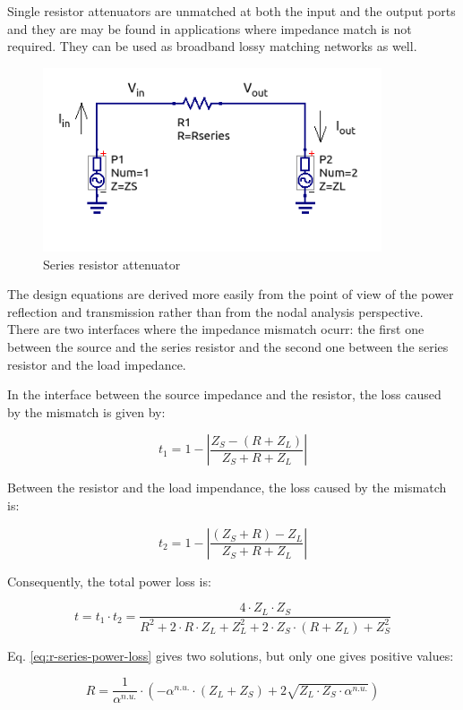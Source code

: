 \noindent Single resistor attenuators are unmatched at both the input and the output ports and they are may be found in applications where impedance match is not required. They can be used as broadband lossy matching networks as well.

  \begin{figure}[ht]
    \centering
    \includegraphics[width=10cm]{./images/r-series-attenuator-schematic.png}
    \caption{Series resistor attenuator}
    \label{fig:r-series-attenuator-schematic}
  \end{figure}

\noindent The design equations are derived more easily from the point of view of the power reflection and transmission rather than from the nodal analysis perspective. There are two interfaces where the impedance mismatch ocurr: the first one between the source and the series resistor and the second one between the series resistor and the load impedance.

\noindent In the interface between the source impedance and the resistor, the loss caused by the mismatch is given by:

\begin{equation}
	t_1 = 1 - \left| \frac{Z_S - (R + Z_L)}{Z_S + R + Z_L}\right|
\end{equation}  

\noindent Between the resistor and the load impendance, the loss caused by the mismatch is:

\begin{equation}
	t_2 = 1 - \left| \frac{(Z_S + R) - Z_L}{Z_S + R + Z_L}\right|
\end{equation} 

\noindent Consequently, the total power loss is:

\begin{equation}
	t = t_1 \cdot t_2 = \frac{4 \cdot Z_L \cdot Z_S}{R^2 + 2 \cdot R \cdot Z_L + Z_L^2 + 2 \cdot Z_S \cdot (R  + Z_L) + Z_S^2}
	\label{eq:r-series-power-loss}
\end{equation}

\noindent Eq. \ref{eq:r-series-power-loss} gives two solutions, but only one gives positive values:

\begin{equation}
	R = \frac{1}{\alpha^{n.u.}} \cdot \left( -\alpha^{n.u.} \cdot (Z_L + Z_S) + 2 \sqrt{Z_L \cdot Z_S \cdot \alpha^{n.u.}} \right)
\end{equation}
